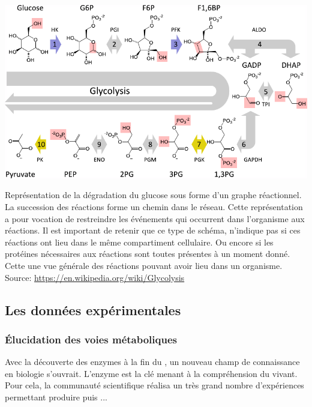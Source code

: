 \begin{refsegment}
    
    \begin{shadedfigure}[H]
        \centering
        \includegraphics[width=\textwidth]{img/graphe_reactions_glycolyse.pdf}
        \caption{Représentation de la dégradation du glucose sous forme d’un graphe réactionnel. La  succession des réactions forme un chemin dans le réseau. Cette représentation a pour vocation de restreindre les événements qui occurrent dans l'organisme aux réactions. Il est important de retenir que ce type de schéma, n'indique pas si ces réactions ont lieu dans le même compartiment cellulaire. Ou encore si les protéines nécessaires aux réactions sont toutes présentes à un moment donné. Cette une vue générale des réactions pouvant avoir lieu dans un organisme. \hspace{\textwidth}\tiny{Source: \url{https://en.wikipedia.org/wiki/Glycolysis}}  }
        \label{fig:glycolysis}
    \end{shadedfigure}

    \subsection{Les données expérimentales}
    
    \subsubsection{Élucidation des voies métaboliques}
    Avec la découverte des enzymes à la fin du , un nouveau champ de connaissance en biologie s’ouvrait. L’enzyme est la clé menant à la compréhension du vivant. Pour cela, la communauté scientifique réalisa un très grand nombre d’expériences permettant produire puis ...

\end{refsegment}
